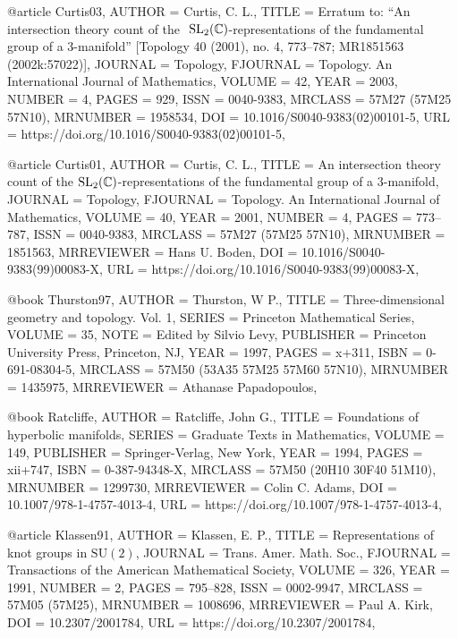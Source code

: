 @article {Curtis03,
    AUTHOR = {Curtis, C. L.},
     TITLE = {Erratum to: ``{A}n intersection theory count of the {$\text{
              SL}_2({\Bbb C})$}-representations of the fundamental group
              of a 3-manifold'' [{T}opology { 40} (2001), no. 4,
              773--787; {MR}1851563 (2002k:57022)]},
   JOURNAL = {Topology},
  FJOURNAL = {Topology. An International Journal of Mathematics},
    VOLUME = {42},
      YEAR = {2003},
    NUMBER = {4},
     PAGES = {929},
      ISSN = {0040-9383},
   MRCLASS = {57M27 (57M25 57N10)},
  MRNUMBER = {1958534},
       DOI = {10.1016/S0040-9383(02)00101-5},
       URL = {https://doi.org/10.1016/S0040-9383(02)00101-5},
}

@article {Curtis01,
    AUTHOR = {Curtis, C. L.},
     TITLE = {An intersection theory count of the {$\text{SL}_2({\Bbb
              C})$}-representations of the fundamental group of a
              {$3$}-manifold},
   JOURNAL = {Topology},
  FJOURNAL = {Topology. An International Journal of Mathematics},
    VOLUME = {40},
      YEAR = {2001},
    NUMBER = {4},
     PAGES = {773--787},
      ISSN = {0040-9383},
   MRCLASS = {57M27 (57M25 57N10)},
  MRNUMBER = {1851563},
MRREVIEWER = {Hans U. Boden},
       DOI = {10.1016/S0040-9383(99)00083-X},
       URL = {https://doi.org/10.1016/S0040-9383(99)00083-X},
}

@book {Thurston97,
    AUTHOR = {Thurston, W P.},
     TITLE = {Three-dimensional geometry and topology. {V}ol. 1},
    SERIES = {Princeton Mathematical Series},
    VOLUME = {35},
      NOTE = {Edited by Silvio Levy},
 PUBLISHER = {Princeton University Press, Princeton, NJ},
      YEAR = {1997},
     PAGES = {x+311},
      ISBN = {0-691-08304-5},
   MRCLASS = {57M50 (53A35 57M25 57M60 57N10)},
  MRNUMBER = {1435975},
MRREVIEWER = {Athanase Papadopoulos},
}

@book {Ratcliffe,
    AUTHOR = {Ratcliffe, John G.},
     TITLE = {Foundations of hyperbolic manifolds},
    SERIES = {Graduate Texts in Mathematics},
    VOLUME = {149},
 PUBLISHER = {Springer-Verlag, New York},
      YEAR = {1994},
     PAGES = {xii+747},
      ISBN = {0-387-94348-X},
   MRCLASS = {57M50 (20H10 30F40 51M10)},
  MRNUMBER = {1299730},
MRREVIEWER = {Colin C. Adams},
       DOI = {10.1007/978-1-4757-4013-4},
       URL = {https://doi.org/10.1007/978-1-4757-4013-4},
}

@article {Klassen91,
    AUTHOR = {Klassen, E. P.},
     TITLE = {Representations of knot groups in {$\text{SU}(2)$}},
   JOURNAL = {Trans. Amer. Math. Soc.},
  FJOURNAL = {Transactions of the American Mathematical Society},
    VOLUME = {326},
      YEAR = {1991},
    NUMBER = {2},
     PAGES = {795--828},
      ISSN = {0002-9947},
   MRCLASS = {57M05 (57M25)},
  MRNUMBER = {1008696},
MRREVIEWER = {Paul A. Kirk},
       DOI = {10.2307/2001784},
       URL = {https://doi.org/10.2307/2001784},
}

